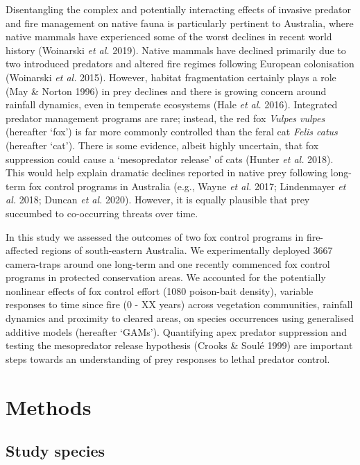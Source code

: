 \documentclass[11pt,a4paper,titlepage,twoside,openright]{style/unimelbthesis}
\begin{document}
\begin{mainmatter}
Disentangling the complex and potentially interacting effects of invasive predator and fire management on native fauna is particularly pertinent to Australia, where native mammals have experienced some of the worst declines in recent world history (Woinarski \emph{et al.} 2019). Native mammals have declined primarily due to two introduced predators and altered fire regimes following European colonisation (Woinarski \emph{et al.} 2015). However, habitat fragmentation certainly plays a role (May \& Norton 1996) in prey declines and there is growing concern around rainfall dynamics, even in temperate ecosystems (Hale \emph{et al.} 2016). Integrated predator management programs are rare; instead, the red fox \emph{Vulpes vulpes} (hereafter `fox') is far more commonly controlled than the feral cat \emph{Felis catus} (hereafter `cat'). There is some evidence, albeit highly uncertain, that fox suppression could cause a `mesopredator release' of cats (Hunter \emph{et al.} 2018). This would help explain dramatic declines reported in native prey following long-term fox control programs in Australia (e.g., Wayne \emph{et al.} 2017; Lindenmayer \emph{et al.} 2018; Duncan \emph{et al.} 2020). However, it is equally plausible that prey succumbed to co-occurring threats over time.

In this study we assessed the outcomes of two fox control programs in fire-affected regions of south-eastern Australia. We experimentally deployed 3667 camera-traps around one long-term and one recently commenced fox control programs in protected conservation areas. We accounted for the potentially nonlinear effects of fox control effort (1080 poison-bait density), variable responses to time since fire (0 - XX years) across vegetation communities, rainfall dynamics and proximity to cleared areas, on species occurrences using generalised additive models (hereafter `GAMs'). Quantifying apex predator suppression and testing the mesopredator release hypothesis (Crooks \& Soulé 1999) are important steps towards an understanding of prey responses to lethal predator control.

\newpage

\hypertarget{methods-1}{%
\section{Methods}\label{methods-1}}

\hypertarget{study-species}{%
\subsection{Study species}\label{study-species}}


\end{mainmatter}
\end{document}
